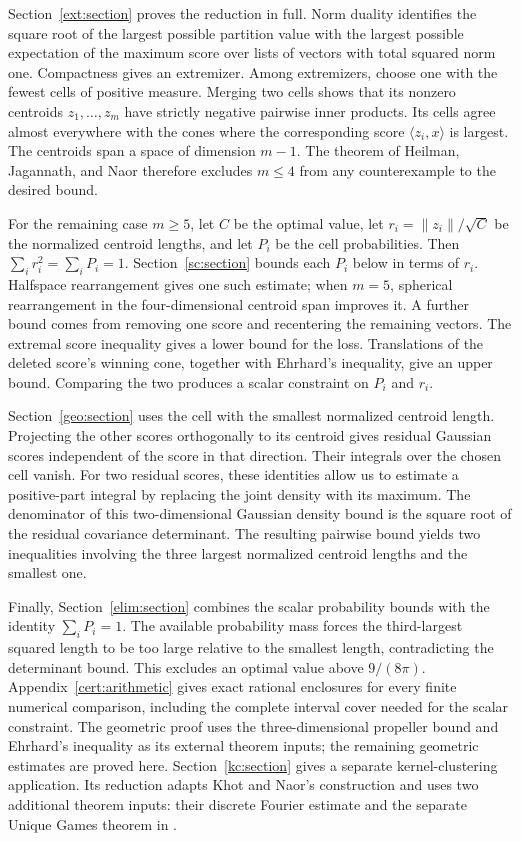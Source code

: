 \documentclass[11pt]{article}
\numberwithin{equation}{section}
\theoremstyle{definition}
\theoremstyle{remark}
\begin{document}
Section~\ref{ext:section} proves the reduction in full. Norm duality
identifies the square root of the largest possible partition value
with the largest possible expectation of the maximum score over lists
of vectors with total squared norm one. Compactness gives an extremizer. Among extremizers, choose
one with the fewest cells of positive measure. Merging two cells shows
that its nonzero centroids $z_1,\ldots,z_m$ have strictly negative
pairwise inner products. Its cells agree almost everywhere with the
cones where the corresponding score $\langle z_i,x\rangle$ is largest.
The centroids span a space of dimension $m-1$. The theorem of
Heilman, Jagannath, and Naor therefore excludes $m\le4$ from any
counterexample to the desired bound.

For the remaining case $m\ge5$, let $C$ be the optimal value, let
$r_i=\|z_i\|/\sqrt C$ be the normalized centroid lengths, and let
$P_i$ be the cell probabilities. Then $\sum_i r_i^2=\sum_iP_i=1$.
Section~\ref{sc:section} bounds each $P_i$ below in terms of $r_i$.
Halfspace rearrangement gives one such estimate; when $m=5$, spherical
rearrangement in the four-dimensional centroid span improves it.
A further bound comes from removing one score and recentering the
remaining vectors. The extremal score inequality gives a lower bound
for the loss. Translations of the deleted score's winning cone,
together with Ehrhard's inequality, give an upper bound. Comparing the
two produces a scalar constraint on $P_i$ and $r_i$.

Section~\ref{geo:section} uses the cell with the smallest normalized
centroid length. Projecting the other scores orthogonally to its centroid gives
residual Gaussian scores independent of the score in that direction.
Their integrals over the chosen cell vanish. For two residual scores,
these identities allow us to estimate a positive-part integral by
replacing the joint density with its maximum. The denominator of this
two-dimensional Gaussian density bound is the
square root of the residual covariance determinant. The resulting
pairwise bound yields two inequalities involving the three largest
normalized centroid lengths and the smallest one.

Finally, Section~\ref{elim:section} combines the scalar probability
bounds with the identity $\sum_iP_i=1$. The available probability mass
forces the third-largest squared length to be too large relative to
the smallest length, contradicting the determinant bound. This excludes
an optimal value above $9/(8\pi)$. Appendix~\ref{cert:arithmetic}
gives exact rational enclosures for every finite numerical comparison,
including the complete interval cover needed for the scalar constraint.
The geometric proof uses the three-dimensional propeller bound and
Ehrhard's inequality as its external theorem inputs; the remaining
geometric estimates are proved here. Section~\ref{kc:section} gives a
separate kernel-clustering application. Its reduction adapts Khot and
Naor's construction and uses two additional theorem inputs: their
discrete Fourier estimate and the separate Unique Games theorem in
\cite{UniqueGamesTheorem}.
\end{document}
